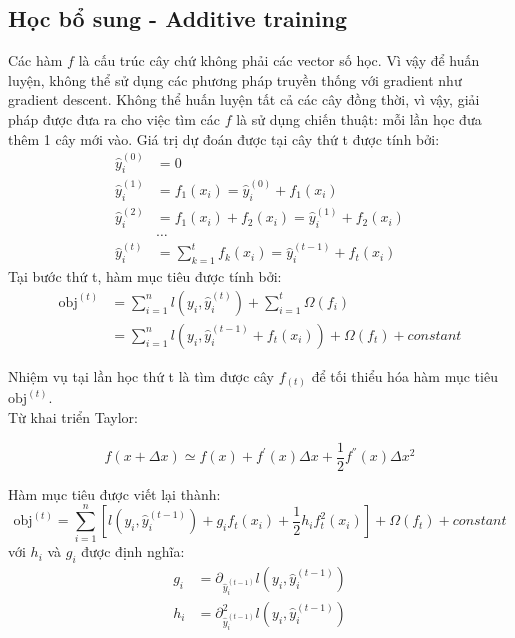 \subsection{Học bổ sung - Additive training}
Các hàm $f$ là cấu trúc cây chứ không phải các vector số học. Vì vậy để huấn luyện, không thể sử dụng các phương pháp truyền thống với gradient như gradient descent. Không thể huấn luyện tất cả các cây đồng thời, vì vậy, giải pháp được đưa ra cho việc tìm các $f$ là sử dụng chiến thuật: mỗi lần học đưa thêm 1 cây mới vào. Giá trị dự đoán được tại cây thứ t được tính bởi:
\begin{equation}
\begin{split}\hat{y}_i^{(0)} &= 0\\
\hat{y}_i^{(1)} &= f_1(x_i) = \hat{y}_i^{(0)} + f_1(x_i)\\
\hat{y}_i^{(2)} &= f_1(x_i) + f_2(x_i)= \hat{y}_i^{(1)} + f_2(x_i)\\
&\dots\\
\hat{y}_i^{(t)} &= \sum_{k=1}^t f_k(x_i)= \hat{y}_i^{(t-1)} + f_t(x_i)
\end{split}
\end{equation}
Tại bước thứ t, hàm mục tiêu được tính bởi:
\begin{equation}
\begin{split}\text{obj}^{(t)} & = \sum_{i=1}^n l(y_i, \hat{y}_i^{(t)}) + \sum_{i=1}^t\Omega(f_i) \\
          & = \sum_{i=1}^n l(y_i, \hat{y}_i^{(t-1)} + f_t(x_i)) + \Omega(f_t) + constant
\end{split}
\end{equation}

Nhiệm vụ tại lần học thứ t là tìm được cây $f_{(t)}$ để tối thiểu hóa hàm mục tiêu $\text{obj}^{(t)}$.\\
Từ khai triển Taylor\cite{5}:

\begin{equation}
f(x + \Delta{x}) \simeq f(x) + f^{'}(x) \Delta{x} + \frac{1}{2}f^{''}(x)\Delta{x^2}  
\end{equation}

Hàm mục tiêu được viết lại thành: 
\begin{equation}
\text{obj}^{(t)} = \sum_{i=1}^n [l(y_i, \hat{y}_i^{(t-1)}) + g_i f_t(x_i) + \frac{1}{2} h_i f_t^2(x_i)] + \Omega(f_t) + constant
\end{equation}
với $h_i$ và $g_i$ được định nghĩa: 
\begin{equation}
    \begin{split}g_i &= \partial_{\hat{y}_i^{(t-1)}} l(y_i, \hat{y}_i^{(t-1)})\\
    h_i &= \partial_{\hat{y}_i^{(t-1)}}^2 l(y_i, \hat{y}_i^{(t-1)})
    \end{split}
\end{equation}

